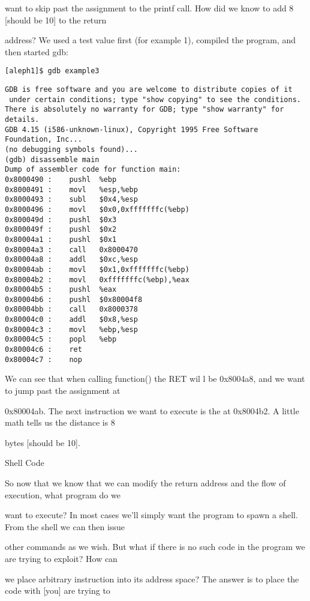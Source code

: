 \documentclass[10pt]{article}
\begin{document}
want to skip past the assignment to the printf call. How did we know to add 8 [should be 10] to the return 

address? We used a test value first (for example 1), compiled the program, and  then started gdb:

\begin{lstlisting}
[aleph1]$ gdb example3
\end{lstlisting}


\begin{lstlisting}
GDB is free software and you are welcome to distribute copies of it
 under certain conditions; type "show copying" to see the conditions.
There is absolutely no warranty for GDB; type "show warranty" for details.
GDB 4.15 (i586-unknown-linux), Copyright 1995 Free Software Foundation, Inc...
(no debugging symbols found)...
(gdb) disassemble main
Dump of assembler code for function main:
0x8000490 :    pushl  %ebp
0x8000491 :    movl   %esp,%ebp
0x8000493 :    subl   $0x4,%esp
0x8000496 :    movl   $0x0,0xfffffffc(%ebp)
0x800049d :    pushl  $0x3
0x800049f :    pushl  $0x2
0x80004a1 :    pushl  $0x1
0x80004a3 :    call   0x8000470 
0x80004a8 :    addl   $0xc,%esp
0x80004ab :    movl   $0x1,0xfffffffc(%ebp)
0x80004b2 :    movl   0xfffffffc(%ebp),%eax
0x80004b5 :    pushl  %eax
0x80004b6 :    pushl  $0x80004f8
0x80004bb :    call   0x8000378 
0x80004c0 :    addl   $0x8,%esp
0x80004c3 :    movl   %ebp,%esp
0x80004c5 :    popl   %ebp
0x80004c6 :    ret
0x80004c7 :    nop
\end{lstlisting}

We can see that when calling function() the RET wil l be 0x8004a8, and we want to jump past the assignment at 

0x80004ab. The next instruction we want to execute is the at 0x8004b2. A little math tells us the distance is 8 

bytes [should be 10]. 

Shell Code

So now that we know that we can modify the return address and the flow of execution, what program do we 

want to execute? In most cases we'll simply want the program to spawn a shell. From the shell we can then issue 

other commands as we wish. But what  if there is no such code in the program we are trying to exploit? How can 

we place arbitrary instruction into its address space? The answer is to place the code with [you] are trying to 
\end{document}
